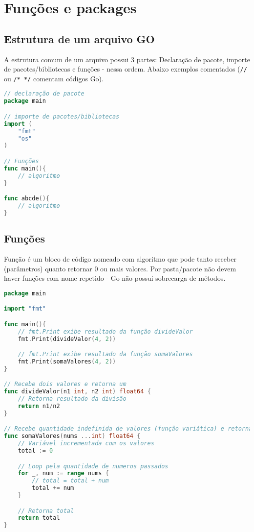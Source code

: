 \documentclass{apostila}
\begin{document}

\chapter{Funções e packages}
\section{Estrutura de um arquivo GO}
A estrutura comum de um arquivo possui 3 partes: Declaração de pacote, importe de pacotes/bibliotecas e funções - nessa ordem. Abaixo exemplos comentados (\texttt{//} ou  \texttt{/* */} comentam códigos Go).

\begin{lstlisting}[language=go,caption=Estrutura de um arquivo.go]
// declaração de pacote
package main

// importe de pacotes/bibliotecas
import (
    "fmt"
    "os"
)

// Funções
func main(){
    // algoritmo
}

func abcde(){
    // algoritmo
}
\end{lstlisting}



\section{Funções}
Função é um bloco de código nomeado com algoritmo que pode tanto receber (parâmetros) quanto retornar 0 ou mais valores\cite[15]{cod3r}. Por pasta/pacote não devem haver funções com nome repetido\cite[8]{cod3r} - Go não possui sobrecarga de métodos.

\begin{lstlisting}[language=go,caption=Funções]
package main

import "fmt"

func main(){
    // fmt.Print exibe resultado da função divideValor
    fmt.Print(divideValor(4, 2))

    // fmt.Print exibe resultado da função somaValores
    fmt.Print(somaValores(4, 2))
}

// Recebe dois valores e retorna um
func divideValor(n1 int, n2 int) float64 {
    // Retorna resultado da divisão
    return n1/n2
}

// Recebe quantidade indefinida de valores (função variática) e retorna um
func somaValores(nums ...int) float64 {
    // Variável incrementada com os valores
    total := 0

    // Loop pela quantidade de numeros passados
    for _, num := range nums {
        // total = total + num
        total += num
    }

    // Retorna total
    return total
}
\end{lstlisting}
\end{document}
